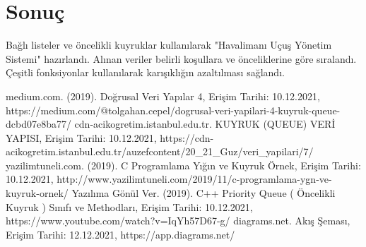 \documentclass[conference]{IEEEtran}
\begin{document}
\section{Sonuç}
Bağlı listeler ve öncelikli kuyruklar kullanılarak "Havalimanı Uçuş Yönetim 
Sistemi" hazırlandı. Alınan veriler belirli koşullara ve önceliklerine göre 
sıralandı. Çeşitli fonksiyonlar kullanılarak karışıklığın azaltılması sağlandı.\\

\renewcommand{\refname}{Kaynakça}
\begin{thebibliography}{00}
 medium.com. (2019). Doğrusal Veri Yapılar 4, Erişim Tarihi: 10.12.2021, https://medium.com/@tolgahan.cepel/dogrusal-veri-yapilari-4-kuyruk-queue-dcbd07e8ba77/
 cdn-acikogretim.istanbul.edu.tr. KUYRUK (QUEUE) VERİ YAPISI, Erişim Tarihi: 10.12.2021, https://cdn-acikogretim.istanbul.edu.tr/auzefcontent/20\_21\_Guz/veri\_yapilari/7/
 yazilimtuneli.com. (2019). C Programlama Yığın ve Kuyruk Örnek, Erişim Tarihi: 10.12.2021, http://www.yazilimtuneli.com/2019/11/c-programlama-ygn-ve-kuyruk-ornek/
 Yazılıma Gönül Ver. (2019). C++ Priority Queue ( Öncelikli Kuyruk ) Sınıfı ve Methodları, Erişim Tarihi: 10.12.2021, https://www.youtube.com/watch?v=IqYh57D67-g/
 diagrams.net. Akış Şeması, Erişim Tarihi: 12.12.2021, https://app.diagrams.net/
\end{thebibliography}
\end{document}
